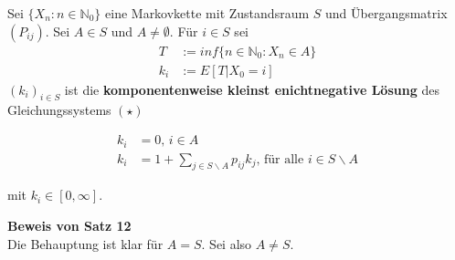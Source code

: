 \documentclass[a4paper,12pt]{article}
\begin{document}
\begin{tcolorbox}[breakable, colframe=green, colback=white, title=Satz 12]
Sei $\{X_n: n \in \mathbb{N}_0\}$ eine Markovkette mit Zustandsraum $S$ und Übergangsmatrix $(P_{ij})$.
Sei $A \in S$ und $A \neq \emptyset$. Für $i \in S$ sei
\begin{align*}
T &:= inf\{n \in \mathbb{N}_0: X_n \in A\} \\
k_i &:= E[T|X_0 = i]
\end{align*}
$(k_i)_{i \in S}$ ist die \textbf{komponentenweise kleinst enichtnegative Lösung} des Gleichungssystems $(\star)$

\begin{align*}
k_i & = 0 \text{, } i \in A \\
k_i & = 1 + \sum_{j \in S \backslash A}p_{ij}k_j \text{, für alle } i \in S \backslash A
\end{align*}

mit $k_i \in [0, \infty]$.
\end{tcolorbox}
\textbf{Beweis von Satz 12}\\
Die Behauptung ist klar für $A=S$. Sei also $A \neq S$.
\end{document}
